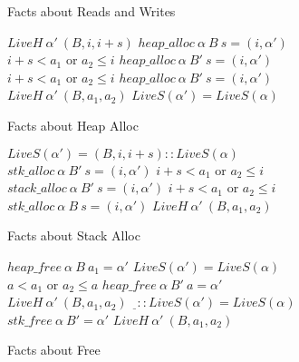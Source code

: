 \documentclass{article}
\begin{document}
\begin{figure}
\begin{subfigure}{0.5\textwidth}
  \caption{Facts about Reads and Writes}
  \end{subfigure}
  \begin{subfigure}{0.49\textwidth}
             {\(LiveH ~ \alpha' ~ (B,i,i+s)\)}
               {\(\mathit{heap\_alloc} ~ \alpha ~ B ~ s = (i, \alpha')\)}
               {\(i+s < a_1\) or \(a_2 \leq i\)}
               {\(\mathit{heap\_alloc} ~ \alpha ~ B' ~ s = (i, \alpha')\)}
               {\(i+s < a_1\) or \(a_2 \leq i\)}
               {\(\mathit{heap\_alloc} ~ \alpha ~ B' ~ s = (i, \alpha')\)}
               {\(LiveH ~ \alpha' ~ (B,a_1,a_2)\)}
             {\(LiveS(\alpha') = LiveS(\alpha)\)}
    \caption{Facts about Heap Alloc}  
  \end{subfigure}
  \begin{subfigure}{0.5\textwidth}
             {\(LiveS(\alpha') = (B,i,i+s)::LiveS(\alpha)\)}
               {\(\mathit{stk\_alloc} ~ \alpha ~ B' ~ s = (i, \alpha')\)}
               {\(i+s < a_1\) or \(a_2 \leq i\)}
               {\(\mathit{stack\_alloc} ~ \alpha ~ B' ~ s = (i, \alpha')\)}
               {\(i+s < a_1\) or \(a_2 \leq i\)}
               {\(\mathit{stk\_alloc} ~ \alpha ~ B ~ s = (i, \alpha')\)}
               {\(LiveH ~ \alpha' ~ (B,a_1,a_2)\)}
    \caption{Facts about Stack Alloc}
  \end{subfigure}
  \begin{subfigure}{0.49\textwidth}
             {\(\mathit{heap\_free} ~ \alpha ~ B ~ a_1 = \alpha'\)}
             {\(LiveS(\alpha') = LiveS(\alpha)\)}
                 {\(a < a_1\) or \(a_2 \leq a\)}
                 {\(\mathit{heap\_free} ~ \alpha ~ B' ~ a = \alpha'\)}
                 {\(LiveH ~ \alpha' ~ (B,a_1,a_2)\)}
             {\(\underline{~~}::LiveS(\alpha') = LiveS(\alpha)\)}
               {\(\mathit{stk\_free} ~ \alpha ~ B' = \alpha'\)}
               {\(LiveH ~ \alpha' ~ (B,a_1,a_2)\)}
    \caption{Facts about Free}
  \end{subfigure}
  \begin{subfigure}{\textwidth}


\end{subfigure}
\end{figure}
\end{document}
